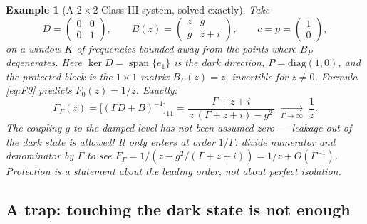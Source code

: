 \documentclass[11pt]{article}
\newtheorem{example}{Example}
\newcommand{\spann}{\operatorname{span}}
\begin{document}
\begin{example}[A $2\times2$ Class III system, solved exactly]
Take
\[
D=\begin{pmatrix}0&0\\0&1\end{pmatrix},\qquad
B(z)=\begin{pmatrix} z & g\\ g & z+i\end{pmatrix},\qquad
c=p=\begin{pmatrix}1\\0\end{pmatrix},
\]
on a window $K$ of frequencies bounded away from the points where $B_P$
degenerates.  Here $\ker D=\spann\{e_1\}$ is the dark direction, $P=\mathrm{diag}(1,0)$,
and the protected block is the $1\times1$ matrix $B_P(z)=z$, invertible for
$z\neq0$.  Formula \eqref{eq:F0} predicts $F_0(z)=1/z$.  Exactly:
\[
F_\Gamma(z)=\big[(\Gamma D+B)^{-1}\big]_{11}
=\frac{\Gamma+z+i}{\,z\,(\Gamma+z+i)-g^2\,}
\;\xrightarrow[\Gamma\to\infty]{}\;\frac1z .
\]
The coupling $g$ to the damped level has \emph{not} been assumed zero ---
leakage out of the dark state is allowed!  It only enters at order
$1/\Gamma$: divide numerator and denominator by $\Gamma$ to see
$F_\Gamma=1/(z-g^2/(\Gamma{+}z{+}i))=1/z+O(\Gamma^{-1})$.  Protection is a
statement about the \emph{leading order}, not about perfect isolation.
\end{example}

\subsection{A trap: touching the dark state is not enough}
\label{sec:trap}
\end{document}
